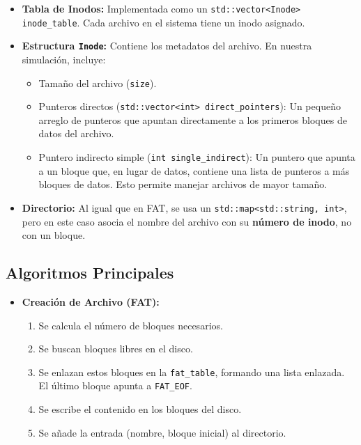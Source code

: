 \documentclass[12pt, a4paper]{article}
\begin{document}
\begin{itemize}
\begin{itemize}
    \item \textbf{Tabla de Inodos:} Implementada como un \texttt{std::vector<Inode> inode\_table}. Cada archivo en el sistema tiene un inodo asignado.
    
    \item \textbf{Estructura \texttt{Inode}:} Contiene los metadatos del archivo. En nuestra simulación, incluye:
    \begin{itemize}
        \item Tamaño del archivo (\texttt{size}).
        \item Punteros directos (\texttt{std::vector<int> direct\_pointers}): Un pequeño arreglo de punteros que apuntan directamente a los primeros bloques de datos del archivo.
        \item Puntero indirecto simple (\texttt{int single\_indirect}): Un puntero que apunta a un bloque que, en lugar de datos, contiene una lista de punteros a más bloques de datos. Esto permite manejar archivos de mayor tamaño.
    \end{itemize}
    
    \item \textbf{Directorio:} Al igual que en FAT, se usa un \texttt{std::map<std::string, int>}, pero en este caso asocia el nombre del archivo con su \textbf{número de inodo}, no con un bloque.
\end{itemize}

\subsection{Algoritmos Principales}

\begin{itemize}
    \item \textbf{Creación de Archivo (FAT):}
    \begin{enumerate}
        \item Se calcula el número de bloques necesarios.
        \item Se buscan bloques libres en el disco.
        \item Se enlazan estos bloques en la \texttt{fat\_table}, formando una lista enlazada. El último bloque apunta a \texttt{FAT\_EOF}.
        \item Se escribe el contenido en los bloques del disco.
        \item Se añade la entrada (nombre, bloque inicial) al directorio.
    \end{enumerate}


\end{itemize}
\end{itemize}
\end{document}
